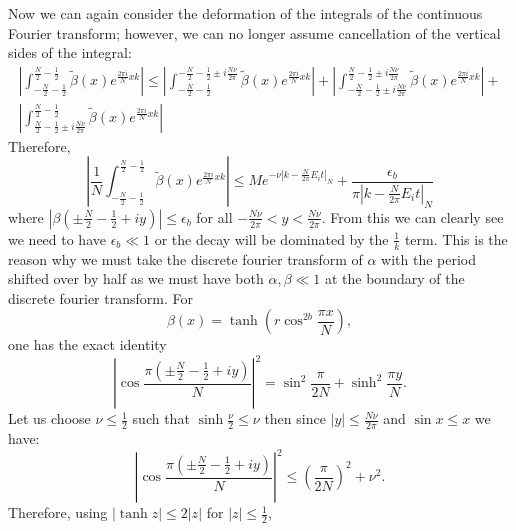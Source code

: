 \documentclass[aps,floatfix,10pt,amssymb,amsfont,amsmath,superscriptaddress,float,nofootinbib,longbibliography,nobalancelastpage,twocolumn]{revtex4-2}
\begin{document}
Now we can again consider the deformation of the integrals of the continuous Fourier transform; however, we can no longer assume cancellation of the vertical sides of the integral:
\begin{multline}
     \left|\int_{-\frac{N}{2}-\frac{1}{2}}^{\frac{N}{2}-\frac{1}{2}}\tilde\beta(x)e^{\frac{2\pi i}{N}xk}\right| \leq \left|\int_{-\frac{N}{2}-\frac{1}{2}}^{-\frac{N}{2}-\frac{1}{2}\pm i\frac{N\nu}{2\pi}}\tilde\beta(x)e^{\frac{2\pi i}{N}xk}\right|+\left|\int_{-\frac{N}{2}-\frac{1}{2}\pm i\frac{N\nu}{2\pi}}^{\frac{N}{2}-\frac{1}{2}\pm i\frac{N\nu}{2\pi}}\tilde\beta(x)e^{\frac{2\pi i}{N}xk}\right|+\\\left|\int_{\frac{N}{2}-\frac{1}{2}\pm i \frac{N\nu}{2\pi}}^{\frac{N}{2}-\frac{1}{2}}\tilde\beta(x)e^{\frac{2\pi i}{N}xk}\right|
\end{multline}
Therefore,
\begin{equation}
    \left|\frac{1}{N}\int_{-\frac{N}{2}-\frac{1}{2}}^{\frac{N}{2}-\frac{1}{2}}\tilde\beta(x)e^{\frac{2\pi i}{N}xk}\right| \leq Me^{-\nu|k-\frac{N}{2\pi}E_i t|_{N}} + \frac{\epsilon_b}{\pi|k-\frac{N}{2\pi}E_i t|_{N}}
\end{equation}
where $|\beta(\pm\frac{N}{2}-\frac{1}{2}+iy)| \leq\epsilon_b$ for all $-\frac{N\nu}{2\pi}<y<\frac{N\nu}{2\pi}$. From this we can clearly see we need to have $\epsilon_b \ll 1$ or the decay will be dominated by the $\frac{1}{k}$ term. This is the reason why we must take the discrete fourier transform of $\alpha$ with the period shifted over by half as we must have both $\alpha, \beta \ll 1$ at the boundary of the discrete fourier transform. For
\begin{equation}
\beta(x)=\tanh\!\left(r\cos^{2b}\frac{\pi x}{N}\right),
\label{eq:betadefinitionvertical}
\end{equation}
one has the exact identity
\begin{equation}
\left|
\cos\frac{\pi\left(\pm\frac{N}{2}-\frac12+iy\right)}{N}
\right|^2
=
\sin^2\frac{\pi}{2N}
+\sinh^2\frac{\pi y}{N}.
\label{eq:verticalcosineidentity}
\end{equation}
Let us choose $\nu \leq \frac{1}{2}$ such that $\sinh \frac{\nu}{2} \leq \nu$ then since $|y|\leq\frac{N\nu}{2\pi}$ and $\sin x\leq x$ we have:
\begin{equation}
\left|
\cos\frac{\pi\left(\pm\frac{N}{2}-\frac12+iy\right)}{N}
\right|^2
\leq
\left(\frac{\pi}{2N}\right)^2+\nu^2.
\label{eq:verticalcosinebound}
\end{equation}
Therefore, using $|\tanh z|\leq2|z|$ for $|z|\leq\frac12$,
\end{document}
